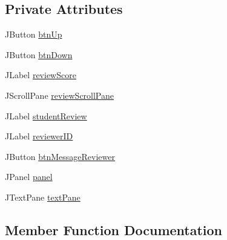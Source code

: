 \subsection*{Private Attributes}
\begin{DoxyCompactItemize}
\item 
J\+Button \mbox{\hyperlink{classcom_1_1_b_n_u_1_1pages_1_1_user_review_1_1_review_model_abf126b7551091cfb8cffe206306c6e39}{btn\+Up}}
\item 
J\+Button \mbox{\hyperlink{classcom_1_1_b_n_u_1_1pages_1_1_user_review_1_1_review_model_a2c897b4590afad98f764f25ae79a7af6}{btn\+Down}}
\item 
J\+Label \mbox{\hyperlink{classcom_1_1_b_n_u_1_1pages_1_1_user_review_1_1_review_model_a1296056509c9ab87c7d8945e33de8550}{review\+Score}}
\item 
J\+Scroll\+Pane \mbox{\hyperlink{classcom_1_1_b_n_u_1_1pages_1_1_user_review_1_1_review_model_a0a6a537d6c98f2eb84747a7830a2a848}{review\+Scroll\+Pane}}
\item 
J\+Label \mbox{\hyperlink{classcom_1_1_b_n_u_1_1pages_1_1_user_review_1_1_review_model_a38257cb5e6e3d98d816b26e81ade4c57}{student\+Review}}
\item 
J\+Label \mbox{\hyperlink{classcom_1_1_b_n_u_1_1pages_1_1_user_review_1_1_review_model_a20f5ab1dc2358bd6e40c18a716555d7a}{reviewer\+ID}}
\item 
J\+Button \mbox{\hyperlink{classcom_1_1_b_n_u_1_1pages_1_1_user_review_1_1_review_model_a1962a3667958b34cac78d5908b6192f0}{btn\+Message\+Reviewer}}
\item 
J\+Panel \mbox{\hyperlink{classcom_1_1_b_n_u_1_1pages_1_1_user_review_1_1_review_model_a3ed0ddf2c2f64bd2a19239cc939a0a96}{panel}}
\item 
J\+Text\+Pane \mbox{\hyperlink{classcom_1_1_b_n_u_1_1pages_1_1_user_review_1_1_review_model_a64332dab97f2261d046f4dc5cba37f02}{text\+Pane}}
\end{DoxyCompactItemize}


\subsection{Member Function Documentation}
\mbox{\label{classcom_1_1_b_n_u_1_1pages_1_1_user_review_1_1_review_model_a638b6ce7359eae8ba42e49032bbc7756}} 
